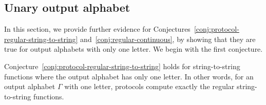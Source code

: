 \subsection{Unary output alphabet}
\label{sec:unary-output-alphabet}
\AP
In this section, we provide further evidence for
Conjectures~\ref{conj:protocol-regular-string-to-string}
and~\ref{conj:regular-continuous},
 by showing that they are true for output
alphabets with only one letter. We begin with the first conjecture.

\begin{theorem}\label{thm:unary-string-to-string}
  Conjecture~\ref{conj:protocol-regular-string-to-string} holds for string-to-string functions where the output alphabet has only one letter. In other words, for an output alphabet $\Gamma$ with one letter, protocols compute exactly the regular string-to-string functions. 
  
\end{theorem}

